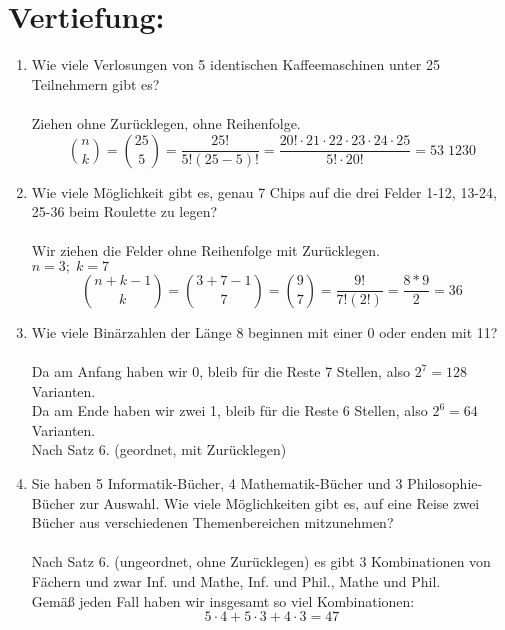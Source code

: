 



    \maketitle
    \section*{Vertiefung:}
    \begin{enumerate}[label=(\alph*)]
        \item  Wie viele Verlosungen von 5 identischen Kaffeemaschinen unter 25 Teilnehmern gibt es?\\\\
        Ziehen ohne Zurücklegen, ohne Reihenfolge.\\    
        $${n \choose k}= {25 \choose 5}= \frac{25!}{5!(25-5)!}= 
        \frac{20!\cdot 21 \cdot 22 \cdot 23 \cdot 24 \cdot 25}{5! \cdot 20!} = 53 \; 1230 $$
        
        \item Wie viele Möglichkeit gibt es, genau 7 Chips auf die drei Felder 1-12, 13-24, 25-36 
        beim Roulette zu legen?\\\\ 
        Wir ziehen die Felder ohne Reihenfolge mit Zur\"ucklegen.\\
        $n=3; \; k=7$ \\
        $$ \binom{n+k-1}{k}= \binom{3+7-1}{7}= \binom{9}{7}=
        \frac{9!}{7!(2!)}= \frac{8*9}{2}=36 $$

        \item Wie viele Binärzahlen der Länge 8 beginnen mit einer 0 oder enden mit 11?\\\\
        Da am Anfang haben wir 0, bleib f\"ur die Reste 7 Stellen, also $2^7 = 128$ Varianten.\\
        Da am Ende haben wir zwei 1, bleib f\"ur die Reste 6 Stellen, also $2^6 = 64$ Varianten.\\
        Nach Satz 6. (geordnet, mit Zur\"ucklegen)

        \item Sie haben 5 Informatik-Bücher, 4 Mathematik-Bücher und 3 Philosophie-Bücher zur
        Auswahl. Wie viele Möglichkeiten gibt es, auf eine Reise zwei Bücher aus verschiedenen
        Themenbereichen mitzunehmen?\\\\
        Nach Satz 6. (ungeordnet, ohne Zur\"ucklegen) es gibt 3 Kombinationen von F\"achern und zwar
        Inf. und Mathe, Inf. und Phil., Mathe und Phil.\\
        Gemäß jeden Fall haben wir insgesamt so viel Kombinationen:
        \[5 \cdot 4 + 5 \cdot 3 + 4 \cdot 3 = 47\]


\end{enumerate}
